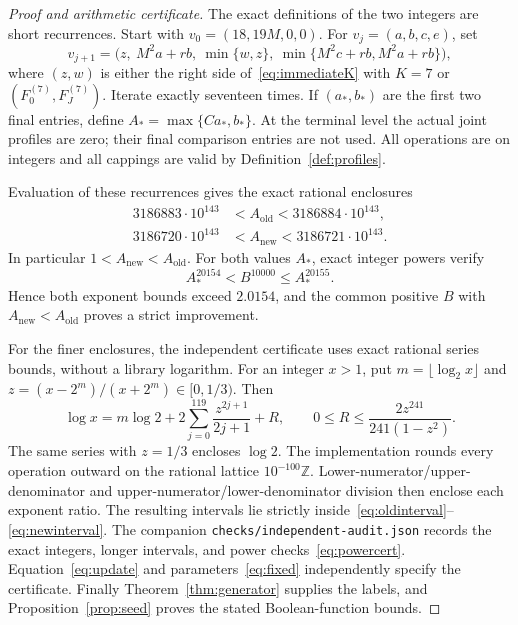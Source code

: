 \documentclass[11pt]{amsart}
\theoremstyle{definition}
\theoremstyle{remark}
\newcommand{\old}{\mathrm{old}}
\newcommand{\new}{\mathrm{new}}
\begin{document}
\begin{proof}[Proof and arithmetic certificate]
The exact definitions of the two integers are short recurrences.
Start with $v_0=(18,19M,0,0)$. For $v_j=(a,b,c,e)$, set
\begin{equation}\label{eq:update}
 v_{j+1}=\bigl(z,\ M^2a+rb,\ \min\{w,z\},\
              \min\{M^2c+rb,M^2a+rb\}\bigr),
\end{equation}
where $(z,w)$ is either the right side of~\eqref{eq:immediateK} with $K=7$
or $(F_0^{(7)},F_J^{(7)})$. Iterate exactly seventeen times. If $(a_*,b_*)$
are the first two final entries, define
$A_*=\max\{Ca_*,b_*\}$. At the terminal level the actual joint
profiles are zero; their final comparison entries are not used.
All operations are on integers and all cappings are valid by
Definition~\ref{def:profiles}.

Evaluation of these recurrences gives the exact rational enclosures
\begin{align*}
 3186883\cdot10^{143}&<A_\old<3186884\cdot10^{143},\\
 3186720\cdot10^{143}&<A_\new<3186721\cdot10^{143}.
\end{align*}
In particular $1<A_\new<A_\old$. For both values $A_*$, exact integer
powers verify
\begin{equation}\label{eq:powercert}
 A_*^{20154}<B^{10000}\le A_*^{20155}.
\end{equation}
Hence both exponent bounds exceed $2.0154$, and the common positive
$B$ with $A_\new<A_\old$ proves a strict improvement.

For the finer enclosures, the independent certificate uses exact rational
series bounds, without a library logarithm. For an integer $x>1$, put
$m=\lfloor\log_2x\rfloor$ and $z=(x-2^m)/(x+2^m)\in[0,1/3)$.
Then
\[
 \log x=m\log2+2\sum_{j=0}^{119}\frac{z^{2j+1}}{2j+1}+R,
 \qquad 0\le R\le\frac{2z^{241}}{241(1-z^2)}.
\]
The same series with $z=1/3$ encloses $\log2$. The implementation rounds
every operation outward on the rational lattice $10^{-100}\mathbb Z$.
Lower-numerator/upper-denominator and upper-numerator/lower-denominator
division then enclose each exponent ratio. The resulting intervals lie
strictly inside~\eqref{eq:oldinterval}--\eqref{eq:newinterval}.
The companion \nolinkurl{checks/independent-audit.json} records the exact
integers, longer intervals, and power checks~\eqref{eq:powercert}.
Equation~\eqref{eq:update} and parameters~\eqref{eq:fixed} independently
specify the certificate.
Finally Theorem~\ref{thm:generator} supplies the labels, and
Proposition~\ref{prop:seed} proves the stated Boolean-function bounds.
\end{proof}
\end{document}
